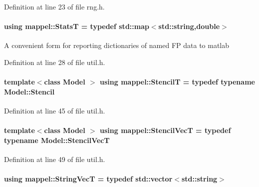 Definition at line 23 of file rng.\+h.

\paragraph[{\texorpdfstring{StatsT}{StatsT}}]{\setlength{\rightskip}{0pt plus 5cm}using {\bf mappel\+::\+StatsT} = typedef std\+::map$<$std\+::string,double$>$}\hypertarget{namespacemappel_a04ab395b0cf82c4ce68a36b2212649a5}{}\label{namespacemappel_a04ab395b0cf82c4ce68a36b2212649a5}
A convenient form for reporting dictionaries of named FP data to matlab 

Definition at line 28 of file util.\+h.

\paragraph[{\texorpdfstring{StencilT}{StencilT}}]{\setlength{\rightskip}{0pt plus 5cm}template$<$class Model $>$ using {\bf mappel\+::\+StencilT} = typedef typename Model\+::\+Stencil}\hypertarget{namespacemappel_a3a06598240007876f8c4bf834ad86197}{}\label{namespacemappel_a3a06598240007876f8c4bf834ad86197}


Definition at line 45 of file util.\+h.

\paragraph[{\texorpdfstring{Stencil\+VecT}{StencilVecT}}]{\setlength{\rightskip}{0pt plus 5cm}template$<$class Model $>$ using {\bf mappel\+::\+Stencil\+VecT} = typedef typename Model\+::\+Stencil\+VecT}\hypertarget{namespacemappel_a62f73447ef1973cca188b1b801864f7e}{}\label{namespacemappel_a62f73447ef1973cca188b1b801864f7e}


Definition at line 49 of file util.\+h.

\paragraph[{\texorpdfstring{String\+VecT}{StringVecT}}]{\setlength{\rightskip}{0pt plus 5cm}using {\bf mappel\+::\+String\+VecT} = typedef std\+::vector$<$std\+::string$>$}\hypertarget{namespacemappel_aae88cf18bccfbb789a6019bcfbbfca68}{}\label{namespacemappel_aae88cf18bccfbb789a6019bcfbbfca68}


